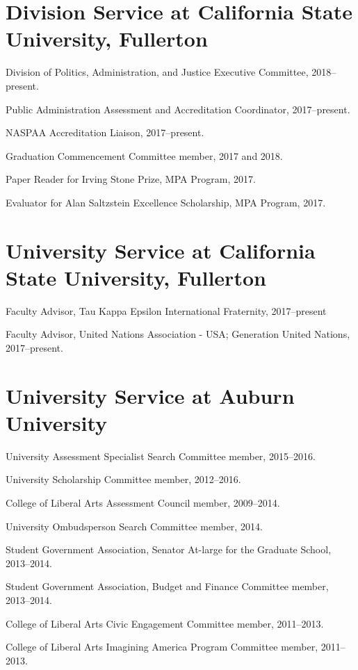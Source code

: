 \documentclass[11pt,letterpaper]{article}
\renewenvironment{itemize}{
  \begin{list}{}{
    \setlength{\leftmargin}{1.5em}
    \setlength{\itemsep}{0.25em}
    \setlength{\parskip}{0pt}
    \setlength{\parsep}{0.25em}
  }
}{
  \end{list}
}
\begin{document}
\section*{Division Service at California State University, Fullerton}
	\begin{itemize}
		\item Division of Politics, Administration, and Justice Executive Committee, 2018--present. 
		\item Public Administration Assessment and Accreditation Coordinator, 2017--present.
		\item NASPAA Accreditation Liaison, 2017--present.
		\item Graduation Commencement Committee member, 2017 and 2018.
		\item Paper Reader for Irving Stone Prize, MPA Program, 2017.
		\item Evaluator for Alan Saltzstein Excellence Scholarship, MPA Program, 2017. 
	\end{itemize}

\section*{University Service at California State University, Fullerton}
	\begin{itemize}
		\item Faculty Advisor, Tau Kappa Epsilon International Fraternity, 2017--present
		\item Faculty Advisor, United Nations Association - USA; Generation United Nations, 2017--present.
	\end{itemize}
	
\section*{University Service at Auburn University}
\begin{itemize}
	\item University Assessment Specialist Search Committee member, 2015--2016.
	\item University Scholarship Committee member, 2012--2016.
	\item College of Liberal Arts Assessment Council member, 2009--2014.
	\item University Ombudsperson Search Committee member, 2014.  
	\item Student Government Association, Senator At-large for the Graduate School, 2013--2014.
	\item Student Government Association, Budget and Finance Committee member, 2013--2014.
	\item College of Liberal Arts Civic Engagement Committee member, 2011--2013.
	\item College of Liberal Arts Imagining America Program Committee member, 2011--2013.
\end{itemize}
\end{document}
